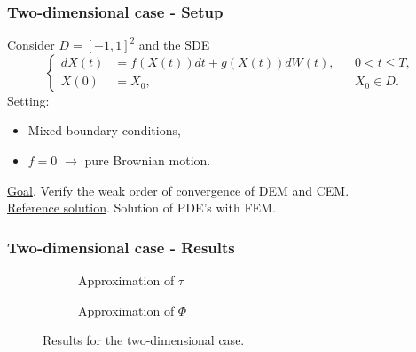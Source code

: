 \begin{frame}
\frametitle{Two-dimensional case - Setup}
Consider $D=[-1,1]^2$ and the SDE
\begin{equation*}
\left \{
\begin{aligned}
	dX(t) &= f(X(t)) dt + g(X(t))dW(t), && 0 < t \leq T, \\
	X(0)  &= X_0, && X_0 \in D.
\end{aligned} \right .
\end{equation*}
Setting:
\begin{itemize}
	\item Mixed boundary conditions, \\
	\item $f = 0$ $\to$ pure Brownian motion.
\end{itemize}
\underline{Goal}. Verify the weak order of convergence of DEM and CEM. \\
\underline{Reference solution}. Solution of PDE's with FEM.
\end{frame}

\begin{frame}
\frametitle{Two-dimensional case - Results}
\begin{figure}[t]
    \centering
    \begin{subfigure}{0.49\linewidth}
        \centering
        \resizebox{1\linewidth}{!}{ }  
        \caption{Approximation of $\tau$}
        \label{fig:KillOneDPhi}
    \end{subfigure}
    \begin{subfigure}{0.49\linewidth}
        \centering
        \resizebox{1\linewidth}{!}{ }  
        \caption{Approximation of $\Phi$}
        \label{fig:ReflectOneDPhi}
    \end{subfigure}    
    \caption{Results for the two-dimensional case.}
\end{figure}
\end{frame}
